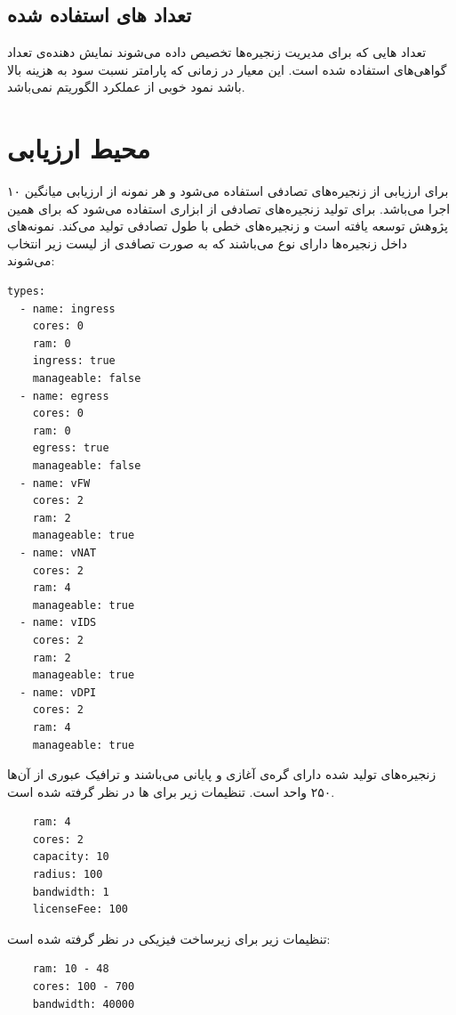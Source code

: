 \subsection{تعداد های استفاده شده}

تعداد هایی که برای مدیریت زنجیره‌ها تخصیص داده می‌شوند نمایش دهنده‌ی تعداد گواهی‌های استفاده شده است.
این معیار در زمانی که پارامتر نسبت سود به هزینه بالا باشد نمود خوبی از عملکرد الگوریتم نمی‌باشد.

\section{محیط ارزیابی}

برای ارزیابی از زنجیره‌های تصادفی استفاده می‌شود و هر نمونه از ارزیابی میانگین ۱۰ اجرا می‌باشد.
برای تولید زنجیره‌های تصادفی از ابزاری استفاده می‌شود که برای همین پژوهش توسعه یافته است و زنجیره‌های خطی با طول تصادفی تولید می‌کند.
نمونه‌های داخل زنجیره‌ها دارای نوع می‌باشند که به صورت تصافدی از لیست زیر انتخاب می‌شوند:

\begin{latin}
    \begin{verbatim}
types:
  - name: ingress
    cores: 0
    ram: 0
    ingress: true
    manageable: false
  - name: egress
    cores: 0
    ram: 0
    egress: true
    manageable: false
  - name: vFW
    cores: 2
    ram: 2
    manageable: true
  - name: vNAT
    cores: 2
    ram: 4
    manageable: true
  - name: vIDS
    cores: 2
    ram: 2
    manageable: true
  - name: vDPI
    cores: 2
    ram: 4
    manageable: true
    \end{verbatim}
\end{latin}

زنجیره‌های تولید شده دارای گره‌ی آغازی و پایانی می‌باشند
و ترافیک عبوری از آن‌ها ۲۵۰ واحد است.
تنظیمات زیر برای ها در نظر گرفته شده است.

\begin{latin}
    \begin{verbatim}
    ram: 4
    cores: 2
    capacity: 10
    radius: 100
    bandwidth: 1
    licenseFee: 100
    \end{verbatim}
\end{latin}

تنظیمات زیر برای زیرساخت فیزیکی در نظر گرفته شده است:


\begin{latin}
    \begin{verbatim}
    ram: 10 - 48
    cores: 100 - 700
    bandwidth: 40000
    \end{verbatim}
\end{latin}

